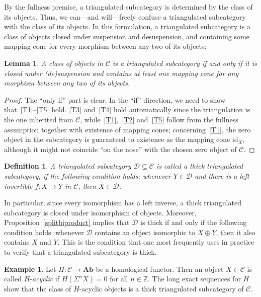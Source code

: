\documentclass{amsproc}
\newtheorem{defn}[prop]{Definition}
\newtheorem{lem}[prop]{Lemma}
\theoremstyle{definition}
\newtheorem{ex}[prop]{Example}
\begin{document}
By the fullness premise, a triangulated subcategory is determined by the class of its objects. Thus, we can---and will---freely confuse a triangulated subcategory with the class of its objects. In this formulation, a triangulated subcategory is a class of objects closed under suspension and desuspension, and containing some mapping cone for every morphism between any two of its objects:

\begin{lem}
\label{trisubcatcrit}
A class of objects in ${\mathcal{C}}$ is a triangulated subcategory if and only if it is closed under (de)suspension and contains at least one mapping cone for any morphism between any two of its objects.
\end{lem}

\begin{proof}
The ``only if'' part is clear. In the ``if'' direction, we need to show that~\ref{T1}--\ref{T5} hold. \ref{T3} and~\ref{T4} hold automatically since the triangulation is the one inherited from ${\mathcal{C}}$, while~\ref{T1},~\ref{T2} and~\ref{T5} follow from the fullness assumption together with existence of mapping cones; concerning~\ref{T1}, the zero object in the subcategory is guaranteed to existence as the mapping cone ${\mathrm{id}}_X$, although it might not coincide ``on the nose'' with the chosen zero object of ${\mathcal{C}}$.
\end{proof}

\begin{defn}
A triangulated subcategory ${\mathcal{D}}\subseteq{\mathcal{C}}$ is called a \emph{thick triangulated subcategory}, if the following condition holds: whenever $Y\in{\mathcal{D}}$ and there is a left invertible $f:X{\longrightarrow} Y$ in ${\mathcal{C}}$, then $X\in{\mathcal{D}}$.
\end{defn}

In  particular, since every isomorphism has a left inverse, a thick triangulated subcategory is closed under isomorphism of objects. Moreover, Proposition~\ref{splitbiproduct} implies that ${\mathcal{D}}$ is thick if and only if the following condition holds: whenever ${\mathcal{D}}$ contains an object isomorphic to $X\oplus Y$, then it also contains $X$ and $Y$. This is the condition that one most frequently uses in practice to verify that a triangulated subcategory is thick.

\begin{ex}
\label{acyclic}
Let $H:{\mathcal{C}}{\longrightarrow}{\mathbf{Ab}}$ be a homological functor. Then an object $X\in{\mathcal{C}}$ is called $H$-\emph{acyclic} if $H(\Sigma^nX)=0$ for all $n\in{\mathbb{Z}}$. The long exact sequences for $H$ show that the class of $H$-acyclic objects is a thick triangulated subcategory of ${\mathcal{C}}$.
\end{ex}
\end{document}
